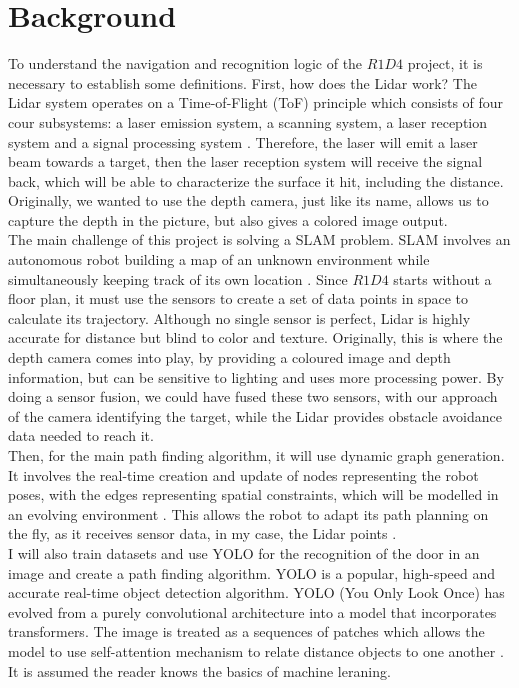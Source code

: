 \documentclass{article}
\begin{document}
\section{Background}

To understand the navigation and recognition logic of the $R1D4$ project, it is necessary to establish some definitions. First, how does the Lidar work? The Lidar system operates on a Time-of-Flight (ToF) principle which consists of four cour subsystems: a laser emission system, a scanning system, a laser reception system and a signal processing system \cite{IBM_LiDAR}. Therefore, the laser will emit a laser beam towards a target, then the laser reception system will receive the signal back, which will be able to characterize the surface it hit, including the distance. Originally, we wanted to use the depth camera, just like its name, allows us to capture the depth in the picture, but also gives a colored image output. \\

The main challenge of this project is solving a SLAM problem. SLAM involves an autonomous robot building a map of an unknown environment while simultaneously keeping track of its own location \cite{MathWorks_SLAM}. Since $R1D4$ starts without a floor plan, it must use the sensors to create a set of data points in space to calculate its trajectory. Although no single sensor is perfect, Lidar is highly accurate for distance but blind to color and texture. Originally, this is where the depth camera comes into play, by providing a coloured image and depth information, but can be sensitive to lighting and uses more processing power. By doing a sensor fusion, we could have fused these two sensors, with our approach of the camera identifying the target, while the Lidar provides obstacle avoidance data needed to reach it. \\

Then, for the main path finding algorithm, it will use dynamic graph generation. It involves the real-time creation and update of nodes representing the robot poses, with the edges representing spatial constraints, which will be modelled in an evolving environment \cite{cho2024open}. This allows the robot to adapt its path planning on the fly, as it receives sensor data, in my case, the Lidar points . \\ 

I will also train datasets and use YOLO for the recognition of the door in an image and create a path finding algorithm. YOLO is a popular, high-speed and accurate real-time object detection algorithm. YOLO (You Only Look Once) has evolved from a purely convolutional architecture into a model that incorporates transformers. The image is treated as a sequences of patches which allows the model to use self-attention mechanism to relate distance objects to one another \cite{GeeksforGeeks_YOLO}. It is assumed the reader knows the basics of machine leraning. 
\end{document}
